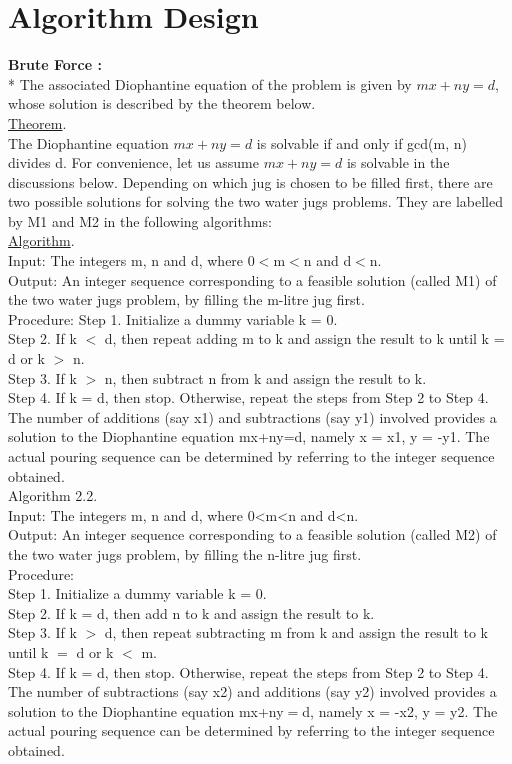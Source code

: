 \documentclass[conference]{IEEEtran}
\begin{document}
\section{Algorithm Design}
\textbf{Brute Force :}\\*
The  associated  Diophantine  equation  of the  problem  is given  by  $mx+ny=d$, whose  solution is described  by  the theorem below.\\
\underline{Theorem}. \\
The Diophantine equation $mx+ny=d$ is solvable if and only if gcd(m, n) divides d. For convenience,  let  us  assume  $mx+ny=d$  is  solvable  in  the discussions below. Depending on which jug is chosen to be filled first, there are two possible solutions for solving the two water jugs problems. They are labelled by M1 and M2 in the following algorithms:\\ 
\underline{Algorithm}.\\
Input: The integers m, n and d, where 0$<$m$<$n and d$<$n.  \\
Output:  An  integer  sequence  corresponding  to  a  feasible solution (called M1) of the two water jugs problem, by filling the m-litre jug first. \\
Procedure:
Step 1. Initialize a dummy variable k = 0.\\
Step 2. If k $<$ d, then repeat adding m to k and assign the result to k until k = d or k $>$ n.\\
Step 3. If k $>$ n, then subtract n from k and assign the result to k.\\
Step 4. If k = d, then stop. Otherwise, repeat the steps from Step 2 to Step 4. The number of additions  (say x1) and subtractions (say  y1) involved  provides a  solution  to  the  Diophantine  equation mx+ny=d, namely x = x1, y = -y1. The actual pouring sequence can  be  determined  by  referring  to  the  integer  sequence obtained.  \\
Algorithm 2.2.\\
Input: The integers m, n and d, where 0<m<n and d<n.  \\
Output:  An  integer  sequence  corresponding  to  a  feasible solution (called M2) of the two water jugs problem, by filling the n-litre jug first.\\
Procedure: \\
Step 1. Initialize a dummy variable k = 0. \\
Step 2. If k = d, then add n to k and assign the result to k. \\
Step 3. If k $>$ d, then repeat subtracting m from k and assign the result to k until k $=$ d or k $<$ m.  \\
Step 4. If k = d, then stop. Otherwise, repeat the steps from Step 2 to Step 4. The number of subtractions  (say x2)  and additions (say y2) involved  provides a  solution  to  the  Diophantine  equation mx+ny$=$d, namely x = -x2, y = y2. The actual pouring sequence can  be  determined  by  referring  to  the  integer  sequence obtained.\\
\end{document}
